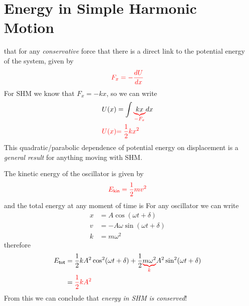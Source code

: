 \section{Energy in Simple Harmonic Motion}
\vspace{-0.5cm}
 that for any \emph{conservative} force that there is a direct link to the potential energy of the system, given by 
\begin{align}
\textcolor{red}{F_x = - \frac{dU}{dx}}
\end{align}
For SHM we know that $F_x = - kx$, so we can write 
\begin{align}
U(x) &= \int \p{\underbrace{\textcolor{black}{kx}}_{\mathclap{-F_x}}} dx \\
\p{U(x)} &\p{= \frac{1}{2} k x^2}
\end{align}
This quadratic/parabolic dependence of potential energy on displacement is a \emph{general result} for anything moving with SHM. 

The kinetic energy of the oscillator is given by
\begin{align}
\textcolor{red}{E_{\sf kin} = \frac{1}{2} m v^2}
\end{align}
and the total energy at any moment of time is
For any oscillator we can write
\begin{align}
x &= A \cos(\omega t + \delta)\nonumber \\
v &= -A \omega \sin(\omega t + \delta)\nonumber\\
k &= m \omega^2 \nonumber
\end{align}
therefore 
\begin{align}
E_{\sf tot} &= \frac{1}{2}k A^2 \cos^2(\omega t + \delta) + \frac{1}{2} \textcolor{red}{\underbrace{\textcolor{black}{m \omega^2}}_{k}} A^2 \sin^2(\omega t + \delta) \nonumber\\
&= \textcolor{red}{\frac{1}{2} k A^2}
\end{align}
From this we can conclude that \emph{energy in SHM is conserved}!

